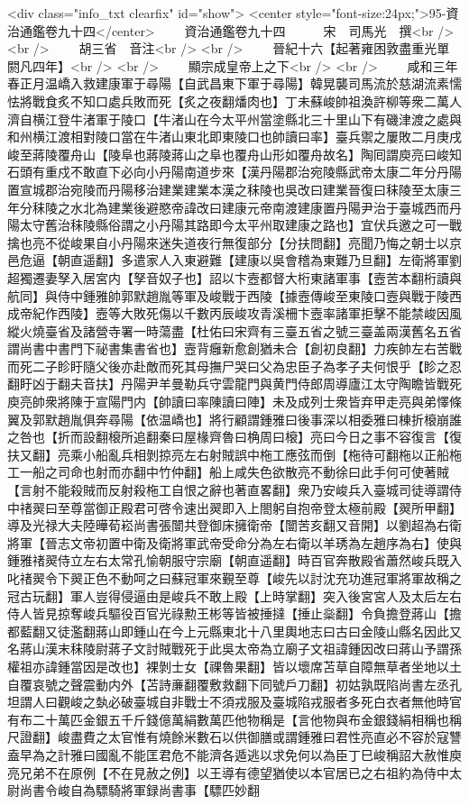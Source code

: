 <div class="info_txt clearfix" id="show">
<center style="font-size:24px;">95-資治通鑑卷九十四</center>
  　　資治通鑑卷九十四　　　宋　司馬光　撰<br />
<br />
　　胡三省　音注<br />
<br />
　　晉紀十六【起著雍困敦盡重光單閼凡四年】<br />
<br />
　　顯宗成皇帝上之下<br />
<br />
　　咸和三年春正月温嶠入救建康軍于尋陽【自武昌東下軍于尋陽】韓晃襲司馬流於慈湖流素懦怯將戰食炙不知口處兵敗而死【炙之夜翻燔肉也】丁未蘇峻帥祖渙許柳等衆二萬人濟自横江登牛渚軍于陵口【牛渚山在今太平州當塗縣北三十里山下有磯津渡之處與和州横江渡相對陵口當在牛渚山東北即東陵口也帥讀曰率】臺兵禦之屢敗二月庚戌峻至蔣陵覆舟山【陵阜也蔣陵蔣山之阜也覆舟山形如覆舟故名】陶囘謂庾亮曰峻知石頭有重戍不敢直下必向小丹陽南道步來【漢丹陽郡治宛陵縣武帝太康二年分丹陽置宣城郡治宛陵而丹陽移治建業建業本漢之秣陵也吳改曰建業晉復曰秣陵至太康三年分秣陵之水北為建業後避愍帝諱改曰建康元帝南渡建康置丹陽尹治于臺城西而丹陽太守舊治秣陵縣俗謂之小丹陽其路即今太平州取建康之路也】宜伏兵邀之可一戰擒也亮不從峻果自小丹陽來迷失道夜行無復部分【分扶問翻】亮聞乃悔之朝士以京邑危逼【朝直遥翻】多遣家人入東避難【建康以吳會稽為東難乃旦翻】左衛將軍劉超獨遷妻孥入居宮内【孥音奴子也】詔以卞壼都督大桁東諸軍事【壼苦本翻桁讀與航同】與侍中鍾雅帥郭默趙胤等軍及峻戰于西陵【據壼傳峻至東陵口壼與戰于陵西成帝紀作西陵】壼等大敗死傷以千數丙辰峻攻青溪柵卞壼率諸軍拒擊不能禁峻因風縱火燒臺省及諸營寺署一時蕩盡【杜佑曰宋齊有三臺五省之號三臺盖兩漢舊名五省謂尚書中書門下祕書集書省也】壼背癰新愈創猶未合【創初良翻】力疾帥左右苦戰而死二子眕盱隨父後亦赴敵而死其母撫尸哭曰父為忠臣子為孝子夫何恨乎【眕之忍翻盱凶于翻夫音扶】丹陽尹羊曼勒兵守雲龍門與黄門侍郎周導廬江太守陶瞻皆戰死庾亮帥衆將陳于宣陽門内【帥讀曰率陳讀曰陣】未及成列士衆皆弃甲走亮與弟懌條翼及郭默趙胤俱奔尋陽【依温嶠也】將行顧謂鍾雅曰後事深以相委雅曰棟折榱崩誰之咎也【折而設翻榱所追翻秦曰屋椽齊魯曰桷周曰榱】亮曰今日之事不容復言【復扶又翻】亮乘小船亂兵相剝掠亮左右射賊誤中柂工應弦而倒【柂待可翻柂以正船柂工一船之司命也射而亦翻中竹仲翻】船上咸失色欲散亮不動徐曰此手何可使著賊【言射不能殺賊而反射殺柂工自恨之辭也著直畧翻】衆乃安峻兵入臺城司徒導謂侍中禇翜曰至尊當御正殿君可啓令速出翜即入上閤躬自抱帝登太極前殿【翜所甲翻】導及光禄大夫陸曄荀崧尚書張闓共登御床擁衛帝【闓苦亥翻又音開】以劉超為右衛將軍【晉志文帝初置中衛及衛將軍武帝受命分為左右衛以羊琇為左趙序為右】使與鍾雅禇翜侍立左右太常孔愉朝服守宗廟【朝直遥翻】時百官奔散殿省蕭然峻兵既入叱禇翜令下翜正色不動呵之曰蘇冠軍來覲至尊【峻先以討沈充功進冠軍將軍故稱之冠古玩翻】軍人豈得侵逼由是峻兵不敢上殿【上時掌翻】突入後宮宮人及太后左右侍人皆見掠奪峻兵驅役百官光祿勲王彬等皆被捶撻【捶止橤翻】令負擔登蔣山【擔都藍翻又徒濫翻蔣山即鍾山在今上元縣東北十八里輿地志曰古曰金陵山縣名因此又名蔣山漢末秣陵尉蔣子文討賊戰死于此吳太帝為立廟子文祖諱鍾因改曰蔣山予謂孫權祖亦諱鍾當因是改也】裸剝士女【祼魯果翻】皆以壞席苫草自障無草者坐地以土自覆哀號之聲震動内外【苫詩亷翻覆敷救翻下同號戶刀翻】初姑孰既陷尚書左丞孔坦謂人曰觀峻之埶必破臺城自非戰士不須戎服及臺城陷戎服者多死白衣者無他時官有布二十萬匹金銀五千斤錢億萬絹數萬匹他物稱是【言他物與布金銀錢絹相稱也稱尺證翻】峻盡費之太官惟有燒餘米數石以供御膳或謂鍾雅曰君性亮直必不容於寇讐盍早為之計雅曰國亂不能匡君危不能濟各遁逃以求免何以為臣丁巳峻稱詔大赦惟庾亮兄弟不在原例【不在見赦之例】以王導有德望猶使以本官居已之右祖約為侍中太尉尚書令峻自為驃騎將軍録尚書事【驃匹妙翻